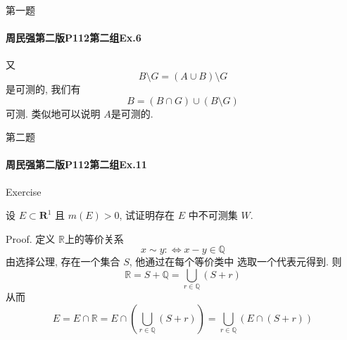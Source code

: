 \documentclass{beamer}
\begin{document}
\begin{frame}[fragile]{第一题}
\framesubtitle{周民强第二版P112第二组Ex.6}
又 \[
    B\setminus G= \left( A\cup B \right)\setminus G 
    \]是可测的, 我们有 \[
    B= \left( B\cap G \right)\cup \left( B\setminus G \right)  
    \] 可测. 类似地可以说明 \(  A  \)是可测的. 
\end{frame}


\begin{frame}[fragile]{第二题}
\framesubtitle{周民强第二版P112第二组Ex.11 }

\begin{block}{Exercise}

设 $E \subset \mathbf{R}^1$ 且 $m(E) > 0$, 试证明存在 $E$ 中不可测集 $W$.
\end{block}
Proof.    
     定义 \(  \mathbb{R}   \)上的等价关系 \[
    x\sim y:\iff x-y\in \mathbb{Q} 
    \] 由选择公理, 存在一个集合 \(  S  \), 他通过在每个等价类中 选取一个代表元得到. 则 \[
    \mathbb{R} = S+ \mathbb{Q} = \bigcup _{r\in \mathbb{Q} }\left( S+ r \right) 
    \]从而 \[
    E= E\cap \mathbb{R} = E\cap \left( \bigcup _{r\in \mathbb{Q} }\left( S+ r \right)  \right)= \bigcup _{r\in \mathbb{Q} }\left( E\cap \left( S+ r \right)  \right)  
    \]
\end{frame}
\end{document}
